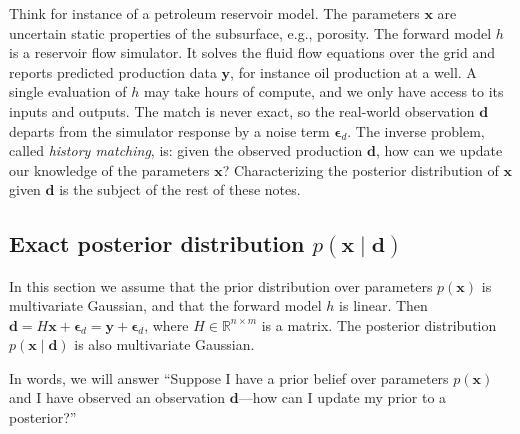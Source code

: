 \documentclass[12pt, a4paper]{article}
\theoremstyle{spaced}
\theoremstyle{spaceddef}
\numberwithin{equation}{section}
\newcommand{\R}{\mathbb{R}}
\begin{document}
Think for instance of a petroleum reservoir model.
The parameters $\bm{x}$ are uncertain static properties of the subsurface, e.g., porosity.
The forward model $h$ is a reservoir flow simulator.
It solves the fluid flow equations over the grid and reports predicted production data $\bm{y}$, for instance oil production at a well.
A single evaluation of $h$ may take hours of compute, and we only have access to its inputs and outputs.
The match is never exact, so the real-world observation $\bm{d}$ departs from the simulator response by a noise term $\bm{\epsilon}_d$.
The inverse problem, called \emph{history matching}, is: given the observed production $\bm{d}$, how can we update our knowledge of the parameters $\bm{x}$?
Characterizing the posterior distribution of $\bm{x}$ given $\bm{d}$ is the subject of the rest of these notes.

\subsection{Exact posterior distribution $p(\bm{x} \mid \bm{d})$}

In this section we assume that the prior distribution over parameters $p(\bm{x})$ is multivariate Gaussian, and that the forward model $h$ is linear.
Then $\bm{d} = H \bm{x} + \bm{\epsilon}_d = \bm{y} + \bm{\epsilon}_d$, where $H \in \R^{n \times m}$ is a matrix.
The posterior distribution $p(\bm{x} \mid \bm{d})$ is also multivariate Gaussian.

In words, we will answer ``Suppose I have a prior belief over parameters $p(\bm{x})$ and I have observed an observation $\bm{d}$---how can I update my prior to a posterior?''
\end{document}
